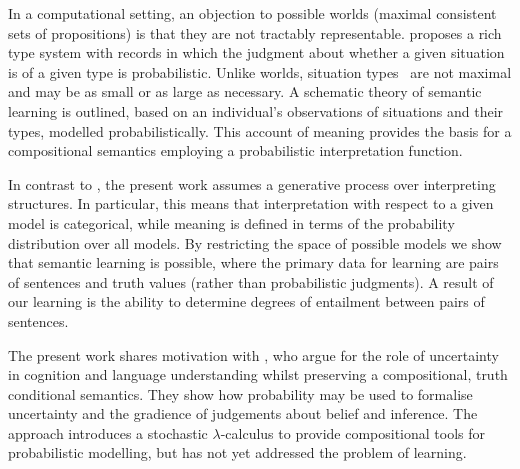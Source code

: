 \documentclass[a4paper,11pt]{article}
\renewcommand{\cite}{\citep}
\newcommand{\newcite}[1]{\citet{#1}}
\theoremstyle{definition}
\begin{document}
In a computational setting, an objection to possible worlds (maximal consistent sets of propositions) is that they are not tractably representable. \newcite{Cooper:14}  proposes a rich type system with records in which the judgment about whether a given situation is of a given type is probabilistic. Unlike worlds, situation types~\cite{Barwise:83} are not maximal and may be as small or as large as necessary. A schematic theory of semantic learning is outlined, based on an individual's observations of situations and their types, modelled probabilistically. This account of meaning provides the basis for a compositional semantics employing a probabilistic interpretation function. 

In contrast to \cite{Cooper:14}, the present work assumes a generative process over interpreting structures. In particular, this means that interpretation with respect to a given model is categorical, while meaning is defined in terms of the probability distribution over all models. By restricting the space of possible models we show that semantic learning is possible, where the primary data for learning are pairs of sentences and truth values (rather than probabilistic judgments). A result of our learning is the ability to determine degrees of entailment between pairs of sentences.

The present work shares motivation with \newcite{Goodman:14}, who argue for the role of uncertainty in cognition and language understanding whilst preserving a compositional, truth conditional semantics. They show how probability may be used to formalise uncertainty and the gradience of judgements about belief and inference. The approach introduces a stochastic $\lambda$-calculus to provide compositional tools for probabilistic modelling,
but has not yet addressed the problem of learning.
\end{document}
